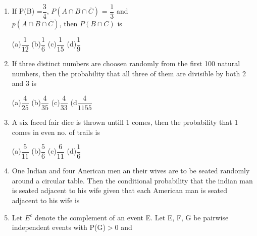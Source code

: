 \documentclass[journal,12pt,twocolumn]{IEEEtran}
\begin{document}
\begin{enumerate}[label=\arabic*]
\begin{itemize}
	\end{itemize}
	\item If P(B) =$\dfrac{3}{4}$, $P(A \cap B \cap \overline{C})$ = $\dfrac{1}{3}$ and\\
	$p(\overline{A} \cap B \cap \overline{C})$, then $P(B \cap C)$ is
	\begin{multicols}{4}
	(a)$\dfrac{1}{12}$   (b)$\dfrac{1}{6}$    (c)$\dfrac{1}{15}$     (d)$\dfrac{1}{9}$\\
	\end{multicols}
	\item If three distinct numbers are choosen randomly from the first 100 natural numbers, then the probability that all three of them are divisible by both 2 and 3 is
	\begin{multicols}{4}
	(a)$\dfrac{4}{25}$   (b)$\dfrac{4}{35}$   (c)$\dfrac{4}{33}$    (d$\dfrac{4}{1155}$
	\end{multicols}
	\item A six faced fair dice is thrown untill 1 comes, then the probability that 1 comes in even no. of trails is
	\begin{multicols}{4}
	(a)$\dfrac{5}{11}$    (b)$\dfrac{5}{6}$    (c)$\dfrac{6}{11}$      (d)$\dfrac{1}{6}$
	\end{multicols}
	\item One Indian and four Anerican men an their wives are to be seated randomly around a circular table. Then the conditional probability that the indian man is seated adjacent to his wife given that each American man is seated adjacent to his wife is
	\begin{itemize}
	\begin{multicols}{4}
	\item[(a)]$\dfrac{1}{2}$  \item[(b)]$\dfrac{1}{3}$   \item[(c)]$\dfrac{2}{5}$    \item[(d)]$\dfrac{1}{5}$
	\end{multicols}
	\end{itemize}
	\item Let $E^{c}$ denote the complement of an event E. Let E, F, G be pairwise independent events with P(G)$>0$ and\\

\end{enumerate}
\end{document}
